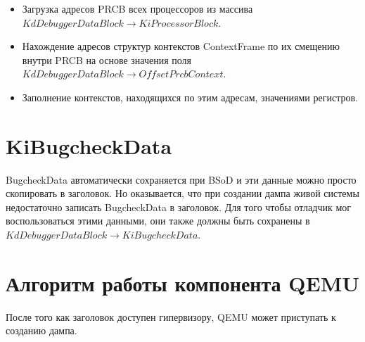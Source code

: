 \documentclass{mipt-thesis-bs}
\begin{document}
\begin{itemize}
\item Загрузка адресов PRCB всех процессоров из массива $KdDebuggerDataBlock \! \rightarrow \! KiProcessorBlock$.
\item Нахождение адресов структур контекстов ContextFrame по их смещению внутри PRCB на основе значения поля $KdDebuggerDataBlock \! \rightarrow \! OffsetPrcbContext$.
\item Заполнение контекстов, находящихся по этим адресам, значениями регистров.
\end{itemize}

\section*{KiBugcheckData}

BugcheckData автоматически сохраняется при BSoD и эти данные можно просто скопировать в заголовок. Но оказывается, что при создании дампа живой системы недостаточно записать BugcheckData в заголовок. Для того чтобы отладчик мог воспользоваться этими данными, они также должны быть сохранены в $KdDebuggerDataBlock \! \rightarrow \! KiBugcheckData$.

\section*{Алгоритм работы компонента QEMU}

После того как заголовок доступен гипервизору, QEMU может приступать к созданию дампа.
\end{document}
